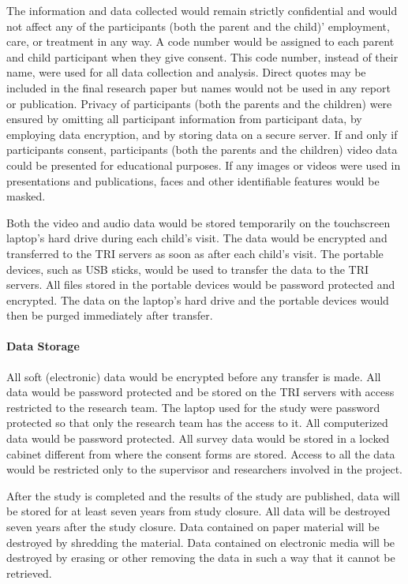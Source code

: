 The information and data collected would remain strictly confidential and would not affect any of the participants (both the parent and the child)' employment, care, or treatment in any way. A code number would be assigned to each parent and child participant when they give consent. This code number, instead of their name, were used for all data collection and analysis. Direct quotes may be included in the final research paper but names would not be used in any report or publication. Privacy of participants (both the parents and the children) were ensured by omitting all participant information from participant data, by employing data encryption, and by storing data on a secure server.  If and only if participants consent, participants (both the parents and the children) video data could be presented for educational purposes.  If any images or videos were used in presentations and publications, faces and other identifiable features would be masked.

Both the video and audio data would be stored temporarily on the touchscreen laptop's hard drive during each child's visit. The data would be encrypted and transferred to the TRI servers as soon as after each child's visit. The portable devices, such as USB sticks, would be used to transfer the data to the TRI servers. All files stored in the portable devices would be password protected and encrypted. The data on the laptop's hard drive and the portable devices would then be purged immediately after transfer. 

\paragraph{Data Storage}
All soft (electronic) data would be encrypted before any transfer is made. All data would be password protected and be stored on the TRI servers with access restricted to the research team. The laptop used for the study were password protected so that only the research team has the access to it. All computerized data would be password protected. All survey data would be stored in a locked cabinet different from where the consent forms are stored. Access to all the data would be restricted only to the supervisor and researchers involved in the project. 

After the study is completed and the results of the study are published, data will be stored for at least seven years from study closure. All data will be destroyed seven years after the study closure. Data contained on paper material will be destroyed by shredding the material. Data contained on electronic media will be destroyed by erasing or other removing the data in such a way that it cannot be retrieved. 

